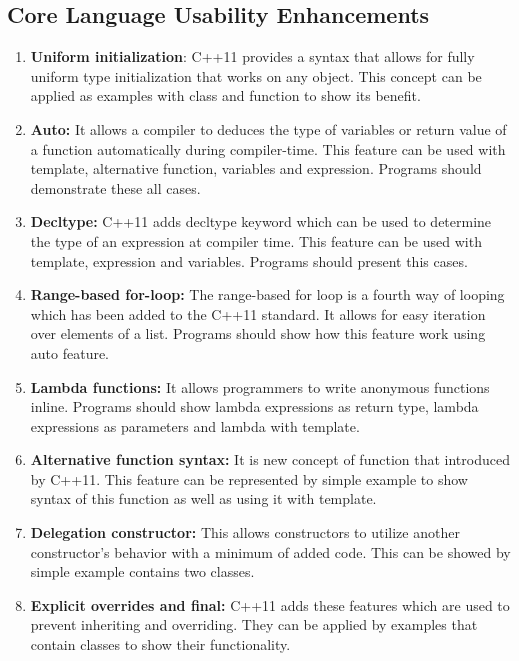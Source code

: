 \documentclass[11pt,]{report}
\begin{document}
\subsection{Core Language Usability Enhancements}
\begin{enumerate}
\item \textbf{Uniform initialization}: C++11 provides a syntax that allows for fully uniform type initialization that works on any object. This concept can be applied as examples with class and function to show its benefit.

\item \textbf{Auto:} It allows a compiler to deduces the type of variables or return value of a function automatically during compiler-time. This feature can be used with template, alternative function, variables and expression. Programs should demonstrate these all cases.

\item \textbf{Decltype:} C++11 adds decltype keyword which can be used to \linebreak determine the type of an expression at compiler time. This feature can be used with template, expression and variables. Programs should present this cases.

\item \textbf{Range-based for-loop:} The range-based for loop is a fourth way of looping which has been added to the C++11 standard. It allows for easy iteration over elements of a list. Programs should show how this feature work using auto feature.

\item \textbf{Lambda functions:} It allows programmers to write anonymous \linebreak functions inline. Programs should show lambda expressions as return type, lambda expressions as parameters and lambda with template.

\item \textbf{Alternative function syntax:} It is new concept of function that \linebreak introduced by C++11. This feature can be represented by simple example to show syntax of this function as well as using it with template.

\item \textbf{Delegation constructor: } This allows constructors to utilize another constructor's behavior with a minimum of added code. This can be showed by  simple example contains two classes.

\item \textbf{Explicit overrides and final:} C++11 adds these features which are used to prevent inheriting and overriding. They can be applied by \linebreak examples that contain classes to show their functionality.


\end{enumerate}
\end{document}
